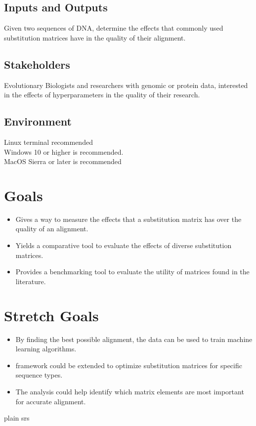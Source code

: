 \documentclass{article}
\begin{document}
\subsection{Inputs and Outputs}

Given two sequences of DNA, determine the effects that commonly used substitution matrices have in the quality of their alignment.

\subsection{Stakeholders}

Evolutionary Biologists and researchers with genomic or protein data,
interested in the effects of hyperparameters in the quality of their research.
\subsection{Environment}

Linux terminal recommended\\
Windows 10 or higher is recommended.\\
MacOS Sierra or later is recommended

\section{Goals}

\begin{itemize}
    \item Gives a way to measure the effects that a substitution matrix has over the quality of an alignment.
    \item Yields a comparative tool to evaluate the effects of diverse substitution matrices.
    \item Provides a benchmarking tool to evaluate the utility of matrices found in the literature.
\end{itemize}

\section{Stretch Goals}

\begin{itemize}
    \item By finding the best possible alignment, the data can be used to train machine learning algorithms.
    \item framework could be extended to optimize substitution matrices for specific sequence types.
    \item The analysis could help identify which matrix elements are most important for accurate alignment.
\end{itemize}

\newpage

 {plain}
 {srs}

\end{document}
